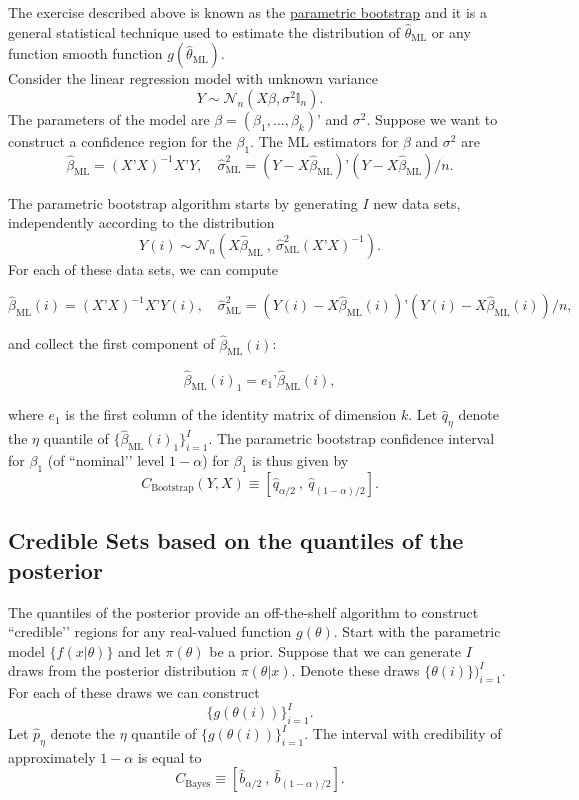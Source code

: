 \documentclass[11pt]{article} %
\begin{document}
The exercise described above is known as the \underline{parametric bootstrap} and it is a general statistical technique used to estimate the distribution of $\widehat{\theta}_{\textrm{ML}}$ or any function smooth function $g(\widehat{\theta}_{\textrm{ML}})$. \\

 Consider the linear regression model with unknown variance
\[ Y \sim \mathcal{N}_n (X\beta, \sigma^2 \mathbb{I}_n). \]
The parameters of the model are $\beta = (\beta_1, \ldots, \beta_{k})’$ and $\sigma^2$. Suppose we want to construct a confidence region for the $\beta_1$. The ML estimators for $\beta$ and $\sigma^2$ are
\[ \widehat{\beta}_{\textrm{ML}} = (X’X)^{-1}X’Y, \quad \widehat{\sigma}^2_{\textrm{ML}} = (Y-X \widehat{\beta}_{\textrm{ML}})’ (Y-X \widehat{\beta}_{\textrm{ML}})/n.  \]

\noindent The parametric bootstrap algorithm starts by generating $I$ new data sets, independently according to the distribution
\[ Y(i)  \sim \mathcal{N}_{n}( X \widehat{\beta}_{\textrm{ML}}\:, \: \widehat{\sigma}^2_{\textrm{ML}} (X’X)^{-1} ).   \]
\noindent For each of these data sets, we can compute 

\[ \widehat{\beta}_{\textrm{ML}}(i) = (X’X)^{-1}X’Y(i), \quad \widehat{\sigma}^2_{\textrm{ML}} = (Y(i)-X \widehat{\beta}_{\textrm{ML}}(i))’ (Y(i)-X \widehat{\beta}_{\textrm{ML}}(i))/n,  \]

\noindent and collect the first component of $ \widehat{\beta}_{\textrm{ML}}(i)$:

\[  \widehat{\beta}_{\textrm{ML}}(i)_1 = e_1’ \widehat{\beta}_{\textrm{ML}}(i), \]

\noindent where $e_1$ is the first column of the identity matrix of dimension $k$. Let $\widehat{q}_{\eta}$ denote the $\eta$ quantile of $\{ \widehat{\beta}_{\textrm{ML}}(i)_1\}_{i=1}^{I}$. The parametric bootstrap confidence interval for $\beta_1$ (of ``nominal’’ level $1-\alpha$) for $\beta_1$ is thus given by
\[ C_{\textrm{Bootstrap}}(Y,X) \equiv [ \widehat{q}_{\alpha/2} \:, \: \widehat{q}_{(1-\alpha)/2} ]. \] 

\subsection{Credible Sets based on the quantiles of the posterior}
The quantiles of the posterior provide an off-the-shelf algorithm to construct ``credible’’ regions for any real-valued function $g(\theta)$. Start with the parametric model $\{f(x|\theta)\}$ and let $\pi(\theta)$ be a prior. Suppose that we can generate $I$ draws from the posterior distribution $\pi(\theta | x)$. Denote these draws $\{ \theta(i) \})_{i=1}^{I}$. For each of these draws we can construct
\[ \Big\{ g(\theta(i)) \Big\}_{i=1}^{I}. \]
Let $\widehat{p}_{\eta}$ denote the $\eta$ quantile of $\{ g(\theta(i))\}_{i=1}^{I}$. The interval with credibility of approximately $1-\alpha$ is equal to
\[ C_{\textrm{Bayes}} \equiv [ \widehat{b}_{\alpha/2} \:, \: \widehat{b}_{(1-\alpha)/2} ]. \] 
\end{document}
